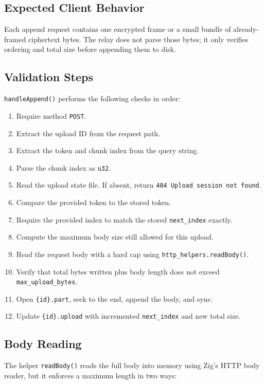 \documentclass[11pt,a4paper]{report}
\begin{document}
\subsection{Expected Client Behavior}

Each append request contains one encrypted frame or a small bundle of already-framed ciphertext bytes. The relay does not parse those bytes; it only verifies ordering and total size before appending them to disk.

\subsection{Validation Steps}

\texttt{handleAppend()} performs the following checks in order:

\begin{enumerate}
    \item Require method \texttt{POST}.
    \item Extract the upload ID from the request path.
    \item Extract the token and chunk index from the query string.
    \item Parse the chunk index as \texttt{u32}.
    \item Read the upload state file. If absent, return \texttt{404 Upload session not found}.
    \item Compare the provided token to the stored token.
    \item Require the provided index to match the stored \texttt{next\_index} exactly.
    \item Compute the maximum body size still allowed for this upload.
    \item Read the request body with a hard cap using \texttt{http\_helpers.readBody()}.
    \item Verify that total bytes written plus body length does not exceed \texttt{max\_upload\_bytes}.
    \item Open \texttt{\{id\}.part}, seek to the end, append the body, and sync.
    \item Update \texttt{\{id\}.upload} with incremented \texttt{next\_index} and new total size.
\end{enumerate}

\subsection{Body Reading}

The helper \texttt{readBody()} reads the full body into memory using Zig's HTTP body reader, but it enforces a maximum length in two ways:
\end{document}

